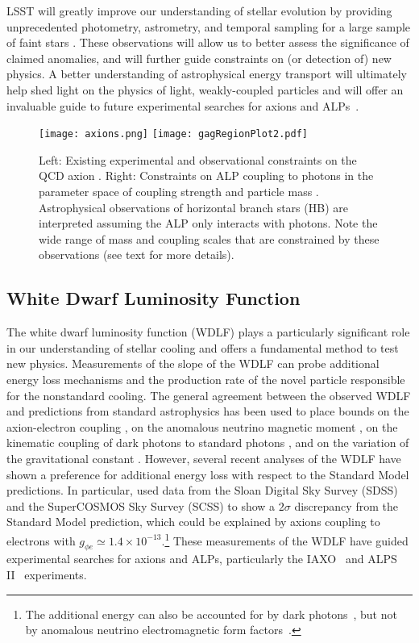 LSST will greatly improve our understanding of stellar evolution by providing unprecedented photometry, astrometry, and temporal sampling for a large sample of faint stars \citep{0912.0201}.
These observations will allow us to better assess the significance of claimed anomalies, and will further guide constraints on (or detection of) new physics.
A better understanding of astrophysical energy transport will ultimately help shed light on the physics of light, weakly-coupled particles and will offer an invaluable guide to future experimental searches for axions and ALPs~\citep{Irastorza:2018dyq}.

\begin{figure}[t]
\centering
\texttt{[image: axions.png]}
\texttt{[image: gagRegionPlot2.pdf]}
\caption{Left: Existing experimental and observational constraints on the QCD axion \citep{Redino:2015}.  
Right: Constraints on ALP coupling to photons in the parameter space of coupling strength and particle mass \citep{DiVecchia:2019}.
Astrophysical observations of horizontal branch stars (HB) are interpreted assuming the ALP only interacts with photons.
Note the wide range of mass and coupling scales that are constrained by these observations (see text for more details).
\label{fig:axions}
}
\end{figure}

\subsection{White Dwarf Luminosity Function}

The white dwarf luminosity function (WDLF) plays a particularly significant role in our understanding of stellar cooling and offers a fundamental method to test new physics.
Measurements of the slope of the WDLF can probe additional energy loss mechanisms and the production rate of the novel particle responsible for the nonstandard cooling.
The general agreement between the observed WDLF and predictions from standard astrophysics has been used to place bounds on the axion-electron coupling \citep{Isern:2008nt,Bertolami:2014wua}, on the anomalous neutrino magnetic moment \citep{Bertolami:2014noa}, on the kinematic coupling of dark photons to standard photons \citep{Chang:2016qfl}, and on the variation of the gravitational constant \citep{Althaus:2011ca}.
However, several recent analyses of the WDLF have shown a preference for additional energy loss with respect to the Standard Model predictions.
In particular, \cite{Bertolami:2014wua} used data from the Sloan Digital Sky Survey (SDSS) and the SuperCOSMOS Sky Survey (SCSS) to show a $2 \sigma$ discrepancy from the Standard Model prediction, which could be explained by axions coupling to electrons with $g_{\phi e}\simeq 1.4\times 10^{-13}$.\footnote{The additional energy can also be accounted for by dark photons~\citep{Giannotti:2015kwo,Chang:2016qfl}, but not by anomalous neutrino electromagnetic form factors~\citep{Bertolami:2014noa}.}
These measurements of the WDLF have guided experimental searches for axions and ALPs, particularly the IAXO~\citep{Irastorza:2011gs,Armengaud:2014gea,Giannotti:2016drd} and ALPS II~\citep{Bahre:2013ywa,ALPSII} experiments.

